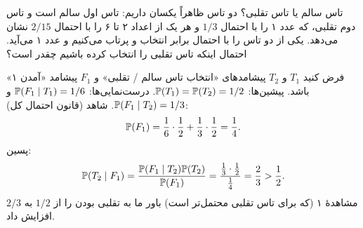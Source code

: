 \begin{example}[label=ex:dice-bayes]{تاس سالم یا تاس تقلبی؟}
دو تاس ظاهراً یکسان داریم: تاس اول سالم است و تاس دوم تقلبی، که عدد ۱ را با احتمال $1/3$ و هر یک از اعداد ۲ تا ۶ را با احتمال $2/15$ نشان می‌دهد. یکی از دو تاس را با احتمال برابر انتخاب و پرتاب می‌کنیم و عدد ۱ می‌آید. احتمال اینکه تاس تقلبی را انتخاب کرده باشیم چقدر است؟
\begin{solution}
فرض کنید $T_1$ و $T_2$ پیشامدهای «انتخاب تاس سالم / تقلبی» و $F_1$ پیشامد «آمدن ۱» باشد. پیشین‌ها: $\P(T_1)=\P(T_2)=1/2$. درست‌نمایی‌ها: $\P(F_1\mid T_1)=1/6$ و $\P(F_1\mid T_2)=1/3$. شاهد (قانون احتمال کل):
\[ \P(F_1)=\frac16\cdot\frac12+\frac13\cdot\frac12=\frac14. \]
پسین:
\[ \P(T_2\mid F_1)=\frac{\P(F_1\mid T_2)\P(T_2)}{\P(F_1)}=\frac{\frac13\cdot\frac12}{\frac14}=\frac23>\frac12. \]
مشاهدهٔ ۱ (که برای تاس تقلبی محتمل‌تر است) باور ما به تقلبی بودن را از $1/2$ به $2/3$ افزایش داد.
\end{solution}
\end{example}

